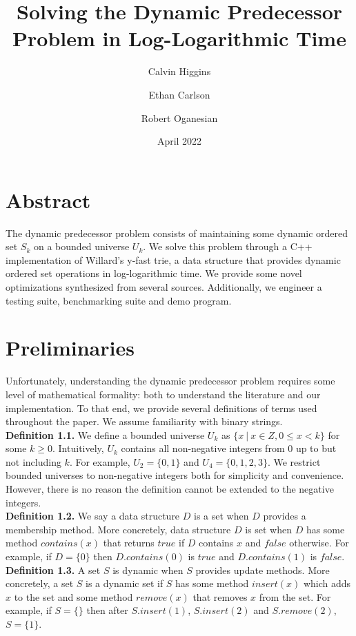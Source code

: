 \documentclass{article}
\title{Solving the Dynamic Predecessor Problem in Log-Logarithmic Time}
\author{Calvin Higgins 
\and Ethan Carlson 
\and Robert Oganesian}
\date{April 2022}
\begin{document}
\maketitle

\section{Abstract}
The dynamic predecessor problem consists of maintaining some dynamic ordered set $S_k$ on a bounded universe $U_k$. We solve this problem through a C++ implementation of Willard’s y-fast trie, a data structure that provides dynamic ordered set operations in log-logarithmic time. We provide some novel optimizations synthesized from several sources. Additionally, we engineer a testing suite, benchmarking suite and demo program.

\section{Preliminaries}

\noindent
Unfortunately, understanding the dynamic predecessor problem requires some level of mathematical formality: both to understand the literature and our implementation. To that end, we provide several definitions of terms used throughout the paper. We assume familiarity with binary strings. 
\\

\noindent
\textbf{Definition 1.1.} We define a bounded universe $U_k$ as $\{x\: |\: x \in {Z}, 0 \leq x < k\}$ for some ${k \geq 0}$. Intuitively, $U_k$ contains all non-negative integers from $0$ up to but not including $k$. For example, ${U_2 = \{0, 1\}}$ and ${U_4 = \{0, 1, 2, 3\}}$. We restrict bounded universes to non-negative integers both for simplicity and convenience. However, there is no reason the definition cannot be extended to the negative integers. 
\\

\noindent
\textbf{Definition 1.2.} We say a data structure $D$ is a set when $D$ provides a membership method. More concretely, data structure $D$ is set when $D$ has some method $contains(x)$ that returns $true$ if $D$ contains $x$ and $false$ otherwise. For example, if $D = \{0\}$ then $D.contains(0)$ is $true$ and $D.contains(1)$ is $false$.
\\

\noindent
\textbf{Definition 1.3.} A set $S$ is dynamic when $S$ provides update methods. More concretely, a set $S$ is a dynamic set if $S$ has some method $insert(x)$ which adds $x$ to the set and some method $remove(x)$ that removes $x$ from the set. For example, if $S = \{\}$ then after $S.insert(1)$, $S.insert(2)$ and $S.remove(2)$, $S = \{1\}$.
\\
\end{document}
